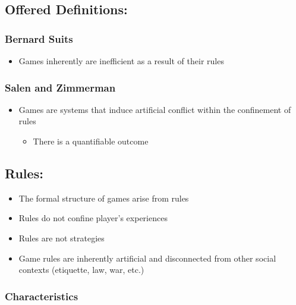 \documentclass{standalone}
\begin{document}
\subsection{Offered Definitions:}\label{offered-definitions}

\subsubsection{Bernard Suits}\label{bernard-suits}

\begin{itemize}
\item
  Games inherently are inefficient as a result of their rules
\end{itemize}

\subsubsection{Salen and Zimmerman}\label{salen-and-zimmerman}

\begin{itemize}
\tightlist
\item
  Games are systems that induce artificial conflict within the
  confinement of rules

  \begin{itemize}
  \item
    There is a quantifiable outcome
  \end{itemize}
\end{itemize}

\subsection{Rules:}\label{rules}

\begin{itemize}
\tightlist
\item
  The formal structure of games arise from rules
\item
  Rules do not confine player's experiences
\item
  Rules are not strategies
\item
  Game rules are inherently artificial and disconnected from other
  social contexts (etiquette, law, war, etc.)
\end{itemize}

\subsubsection{Characteristics}\label{characteristics}
\end{document}

